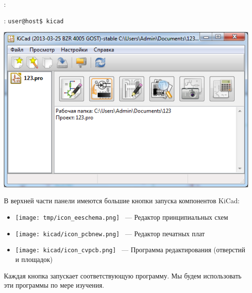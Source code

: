 \win: 

\linux: \verb|user@host$ kicad|

\bigskip
\includegraphics[height=0.8\textheight]{kicad/projman.png}

\bigskip
В верхней части панели   имеются большие
кнопки запуска компонентов KiCad:

\begin{itemize}
\item
\texttt{[image: tmp/icon\_eeschema.png]}
\ --- Редактор принципиальных схем
\item
\texttt{[image: kicad/icon\_pcbnew.png]}
\ --- Редактор печатных плат
\item
\texttt{[image: kicad/icon\_cvpcb.png]}
\ --- Программа редактирования 
(отверстий и площадок)
\end{itemize}

Каждая кнопка запускает соответствующую программу. Мы будем использовать эти
программы по мере изучения.
